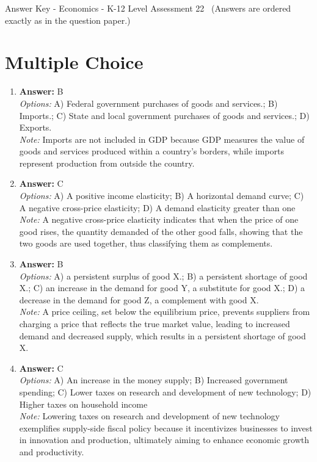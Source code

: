 \documentclass[12pt]{article}
\begin{document}
\begin{center}
Answer Key - Economics - K-12 Level Assessment 22 \
\small (Answers are ordered exactly as in the question paper.)
\end{center}

\section*{Multiple Choice}
\begin{enumerate}[label=\arabic*.]
\item \textbf{Answer:} B
\\ \textit{Options:} A) Federal government purchases of goods and services.; B) Imports.; C) State and local government purchases of goods and services.; D) Exports.
\\ \textit{Note:} Imports are not included in GDP because GDP measures the value of goods and services produced within a country's borders, while imports represent production from outside the country.
\item \textbf{Answer:} C
\\ \textit{Options:} A) A positive income elasticity; B) A horizontal demand curve; C) A negative cross-price elasticity; D) A demand elasticity greater than one
\\ \textit{Note:} A negative cross-price elasticity indicates that when the price of one good rises, the quantity demanded of the other good falls, showing that the two goods are used together, thus classifying them as complements.
\item \textbf{Answer:} B
\\ \textit{Options:} A) a persistent surplus of good X.; B) a persistent shortage of good X.; C) an increase in the demand for good Y, a substitute for good X.; D) a decrease in the demand for good Z, a complement with good X.
\\ \textit{Note:} A price ceiling, set below the equilibrium price, prevents suppliers from charging a price that reflects the true market value, leading to increased demand and decreased supply, which results in a persistent shortage of good X.
\item \textbf{Answer:} C
\\ \textit{Options:} A) An increase in the money supply; B) Increased government spending; C) Lower taxes on research and development of new technology; D) Higher taxes on household income
\\ \textit{Note:} Lowering taxes on research and development of new technology exemplifies supply-side fiscal policy because it incentivizes businesses to invest in innovation and production, ultimately aiming to enhance economic growth and productivity.

\end{enumerate}
\end{document}
